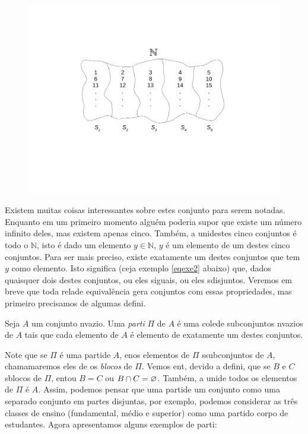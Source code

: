 \begin{figure}[h]
\begin{center}
\includegraphics[width=13cm,trim={3cm 6.5cm 3cm 4cm},clip]{./figuras/figure25.pdf}
\end{center}
\end{figure}

Existem muitas coisas interessantes sobre estes conjunto para serem notadas. Enquanto em um primeiro momento algu\'em poderia supor que existe um n\'umero infinito deles, mas existem apenas cinco. Tamb\'em, a uni\ao destes cinco conjuntos \'e todo o $\mathbb{N}$, isto \'e dado um elemento $y\in\mathbb{N}$, $y$ \'e um elemento de um destes cinco conjuntos. Para ser mais preciso, existe exatamente um destes conjuntos que tem $y$ como elemento. Isto significa (ceja exemplo \ref{eqexe2} abaixo) que, dados quaisquer dois destes conjuntos, ou eles s\ao iguais, ou eles s\ao disjuntos. Veremos em breve que toda rela\cao de equival\^encia gera conjuntos com essas propriedades, mas primeiro precisamos de algumas defini\cois. 
\begin{definb}
Seja $A$ um conjunto n\ao vazio. Uma {\it parti\cao} $\Pi$ de $A$ \'e uma cole\cao de subconjuntos n\ao vazios de $A$ tais que cada elemento de $A$ \'e elemento de exatamente um destes conjuntos.
\end{definb}

Note que se $\Pi$ \'e uma parti\cao de $A$, en\tao os elementos de $\Pi$ s\ao subconjuntos de $A$, chamamaremos eles de os {\it blocos} de $\Pi$. Vemos ent\aoi, devido a defini\caoi, que se $B$ e $C$ s\ao blocos de $\Pi$, ent\ao ou $B=C$ ou $B\cap C=\varnothing$. Tamb\'em, a uni\ao de todos os elementos de $\Pi$ \'e $A$. Assim, podemos pensar que uma parti\cao de um conjunto como uma separa\cao do conjunto em partes disjuntas, por exemplo, podemos considerar as tr\^es classes de ensino (fundamental, m\'edio e superior) como uma parti\cao do corpo de estudantes. Agora apresentamos alguns exemplos de parti\cois:

